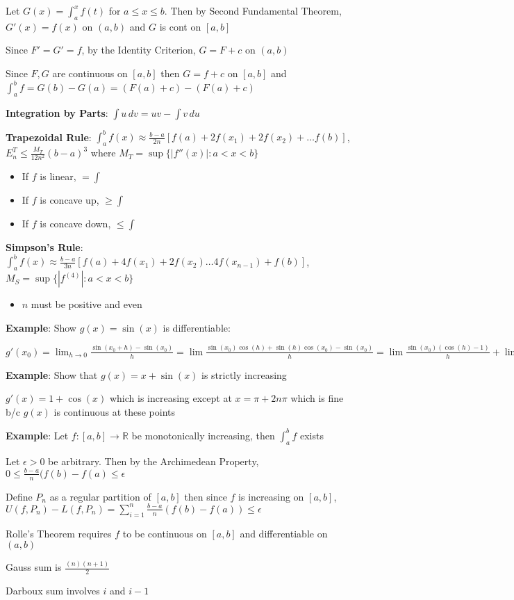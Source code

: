 \documentclass{article}
\begin{document}
Let $G(x) = \int_a^x f(t)$ for $a \leq x \leq b$. Then by Second Fundamental Theorem, $G'(x) = f(x)$ on $(a,b)$ and $G$ is cont on $[a,b]$

Since $F' = G' = f$, by the Identity Criterion, $G = F + c$ on $(a,b)$

Since $F, G$ are continuous on $[a,b]$ then $G = f + c$ on $[a,b]$ and $\int_a^b f= G(b) - G(a) = (F(a) + c) - (F(a) + c)$ \medskip

\textbf{Integration by Parts}: $\int u \, dv = uv - \int v \, du$

\textbf{Trapezoidal Rule}: $\int_a^b f(x) \approx \frac{b-a}{2n}[f(a) + 2f(x_1) + 2f(x_2)+ \ldots f(b)]$, $E_n^T \leq \frac{M_T}{12n^2}(b-a)^3$ where $M_T = \sup\{|f''(x)| \colon a < x < b\}$
\begin{itemize}
  \item If $f$ is linear, $= \int$
  \item If $f$ is concave up, $\geq \int$
  \item If $f$ is concave down, $\leq \int$
\end{itemize}

\textbf{Simpson's Rule}: $\int_a^b f(x) \approx \frac{b-a}{3n}[f(a) + 4f(x_1) + 2f(x_2) \ldots 4f(x_{n-1}) + f(b)]$, $M_S = \sup\{|f^{(4)}| \colon a < x < b\}$
\begin{itemize}
  \item $n$ must be positive and even
\end{itemize}



\textbf{Example}: Show $g(x) = \sin(x)$ is differentiable:

$g'(x_0) = \lim_{h \rightarrow 0}\frac{\sin(x_0 + h) - \sin(x_0)}{h} = \lim\frac{\sin(x_0)\cos(h) + \sin(h)\cos(x_0) - \sin(x_0)}{h} = \lim\frac{\sin(x_0)(\cos(h) - 1)}{h} + \lim\frac{\sin(h)\cos(x_0)}{h} = \cos(x_0)$

\textbf{Example}: Show that $g(x) = x + \sin(x)$ is strictly increasing

$g'(x) = 1 + \cos(x)$ which is increasing except at $x = \pi + 2n\pi$ which is fine b/c $g(x)$ is continuous at these points

\textbf{Example}: Let $f \colon [a,b] \rightarrow \mathbb{R}$ be monotonically increasing, then $\int_a^b f$ exists

Let $\epsilon > 0$ be arbitrary. Then by the Archimedean Property, $0 \leq \frac{b-a}{n}(f(b) - f(a) \leq \epsilon$

Define $P_n$ as a regular partition of $[a,b]$ then since $f$ is increasing on $[a,b]$, $U(f,P_n) - L(f,P_n) = \sum_{i = 1}^n \frac{b-a}{n}(f(b) - f(a)) \leq \epsilon$ \medskip

Rolle's Theorem requires $f$ to be continuous on $[a,b]$ and differentiable on $(a,b)$

Gauss sum is $\frac{(n)(n+1)}{2}$

Darboux sum involves $i$ and $i-1$
\end{document}
